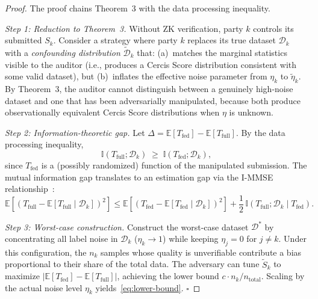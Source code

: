 \documentclass[12pt,a4paper]{article}
\newcommand{\E}{\mathbb{E}}
\newcommand{\I}{\mathbb{I}}
\newcommand{\cD}{\mathcal{D}}
\newcommand{\ZK}{\mathrm{ZK}}
\begin{document}
\begin{proof}
The proof chains Theorem~3 with the data processing inequality.

\textit{Step 1: Reduction to Theorem~3.}
Without $\ZK$ verification, party $k$ controls its submitted $S_k$.  Consider
a strategy where party $k$ replaces its true dataset $\cD_k$ with a
\emph{confounding distribution} $\tilde{\cD}_k$ that: (a)~matches the
marginal statistics visible to the auditor (i.e., produces a Cercis Score
distribution consistent with some valid dataset), but (b)~inflates the
effective noise parameter from $\eta_k$ to $\tilde{\eta}_k$.  By Theorem~3,
the auditor cannot distinguish between a genuinely high-noise dataset and
one that has been adversarially manipulated, because both produce
observationally equivalent Cercis Score distributions when $\eta$ is unknown.

\textit{Step 2: Information-theoretic gap.}
Let $\Delta = \E[T_{\mathrm{fed}}] - \E[T_{\mathrm{full}}]$.  By the data
processing inequality,
\begin{equation}\label{eq:dpi}
    \I(T_{\mathrm{full}}; \cD_k) \;\geq\; \I(T_{\mathrm{fed}}; \cD_k),
\end{equation}
since $T_{\mathrm{fed}}$ is a (possibly randomized) function of the
manipulated submission.  The mutual information gap translates to an
estimation gap via the I-MMSE relationship~\citep{guo2005mutual}:
\begin{equation}\label{eq:immse}
    \E[(T_{\mathrm{full}} - \E[T_{\mathrm{full}} \mid \cD_k])^2]
    \leq \E[(T_{\mathrm{fed}} - \E[T_{\mathrm{fed}} \mid \cD_k])^2]
    + \frac{1}{2}\,\I(T_{\mathrm{full}}; \cD_k \mid T_{\mathrm{fed}}).
\end{equation}

\textit{Step 3: Worst-case construction.}
Construct the worst-case dataset $\cD^*$ by concentrating all label noise in
$\cD_k$ ($\eta_k \to 1$) while keeping $\eta_j = 0$ for $j \neq k$.  Under
this configuration, the $n_k$ samples whose quality is unverifiable contribute
a bias proportional to their share of the total data.  The adversary can tune
$\tilde{S}_k$ to maximize $|\E[T_{\mathrm{fed}}] - \E[T_{\mathrm{full}}]|$,
achieving the lower bound $c \cdot n_k / n_{\mathrm{total}}$.  Scaling by
the actual noise level $\eta_k$ yields~\eqref{eq:lower-bound}.  $\square$
\end{proof}
\end{document}
